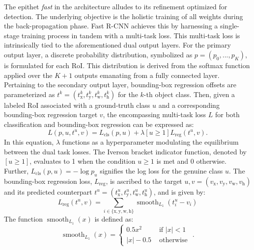 The epithet \textit{fast} in the architecture alludes to its refinement optimized for detection. The underlying objective is the holistic training of all weights during the back-propagation phase. Fast R-CNN achieves this by harnessing a single-stage training process in tandem with a multi-task loss. This multi-task loss is intrinsically tied to the aforementioned dual output layers. For the primary output layer, a discrete probability distribution, symbolized as \(p = (p_0, ..., p_K)\), is formulated for each RoI. This distribution is derived from the softmax function applied over the \(K+1\) outputs emanating from a fully connected layer. Pertaining to the secondary output layer, bounding-box regression offsets are parameterized as \(t^k=\left(t_{\mathrm{x}}^k, t_{\mathrm{y}}^k, t_{\mathrm{w}}^k, t_{\mathrm{h}}^k\right)\) for the \(k\)-th object class. Then, given a labeled RoI associated with a ground-truth class \(u\) and a corresponding bounding-box regression target \(v\), the encompassing multi-task loss \(L\) for both classification and bounding-box regression can be expressed as:
\begin{equation}
L\left(p, u, t^u, v\right)=L_{\mathrm{cls}}(p, u)+\lambda[u \geq 1] L_{\mathrm{reg}}\left(t^u, v\right) \label{eq:fast-rcnn}.
\end{equation}
In this equation, \(\lambda\) functions as a hyperparameter modulating the equilibrium between the dual task losses. The Iverson bracket indicator function, denoted by \([u \geq 1]\), evaluates to 1 when the condition \(u \geq 1\) is met and 0 otherwise. Further, \(L_{\mathrm{cls}}(p, u)=-\log p_u\) signifies the log loss for the genuine class \(u\). The bounding-box regression loss, \(L_{\mathrm{reg}}\), is ascribed to the target \(u, v =\left(v_{\mathrm{x}}, v_{\mathrm{y}}, v_{\mathrm{w}}, v_{\mathrm{h}}\right)\) and its predicted counterpart \(t^u=\left(t_{\mathrm{x}}^u, t_{\mathrm{y}}^u, t_{\mathrm{w}}^u, t_{\mathrm{h}}^u\right)\), and is given by:
\begin{equation}
L_{\mathrm{reg}}\left(t^u, v\right)=\sum_{i \in\{\mathrm{x}, \mathrm{y}, \mathrm{w}, \mathrm{h}\}} \operatorname{smooth}_{L_1}\left(t_i^u-v_i\right)
\end{equation}
The function \(\operatorname{smooth}_{L_1}(x)\) is defined as:
\begin{equation}
\operatorname{smooth}_{L_1}(x)= \begin{cases}0.5 x^2 & \text { if }|x|<1 \\ |x|-0.5 & \text { otherwise }\end{cases}.
\end{equation}

